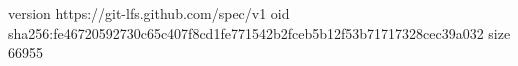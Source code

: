 version https://git-lfs.github.com/spec/v1
oid sha256:fe46720592730c65c407f8cd1fe771542b2fceb5b12f53b71717328cec39a032
size 66955
